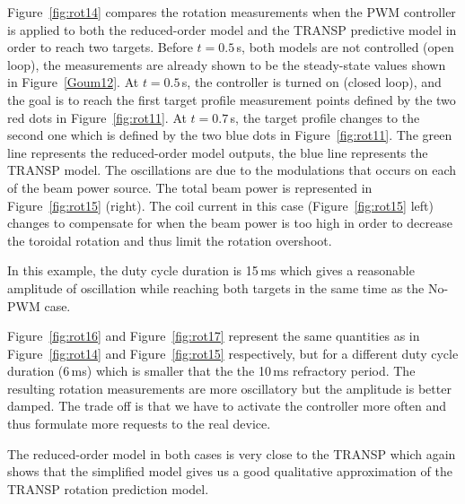 \documentclass[12pt]{iopart}
\begin{document}
Figure~\ref{fig:rot14} compares the rotation measurements when the PWM controller is applied to both the reduced-order model and the TRANSP predictive model in order to reach two targets.
Before $t=0.5$\,s, both models are not controlled (open loop), the measurements are already shown to be the steady-state values shown in Figure~\ref{Goum12}.
At $t = 0.5$\,s, the controller is turned on (closed loop), and the goal is to reach the first target profile measurement points defined by the two red dots in Figure~\ref{fig:rot11}. At $t = 0.7$\,s, the  target profile changes to the second one which is defined by the two blue dots in Figure~\ref{fig:rot11}.
The green line represents the reduced-order model outputs, the blue line represents the TRANSP model. The oscillations are due to the modulations that occurs on each of the beam power source. The total beam power is represented in Figure~\ref{fig:rot15} (right). The coil current in this case (Figure~\ref{fig:rot15} left) changes to compensate for when the beam power is too high in order to decrease the toroidal rotation and thus limit the rotation overshoot.

In this example, the duty cycle duration is 15\,ms which gives a reasonable amplitude of oscillation while reaching both targets in the same time as the No-PWM case.

Figure~\ref{fig:rot16} and Figure~\ref{fig:rot17} represent the same quantities as in Figure~\ref{fig:rot14} and Figure~\ref{fig:rot15} respectively, but for a different duty cycle duration (6\,ms) which is smaller that the the 10\,ms refractory period.
The resulting rotation measurements are more oscillatory but the amplitude is better damped. The trade off is that we have to activate the controller more often and thus formulate more requests to the real device.

The reduced-order model in both cases is very close to the TRANSP which again shows that the simplified model gives us a good qualitative approximation of the TRANSP rotation prediction model.
\end{document}
